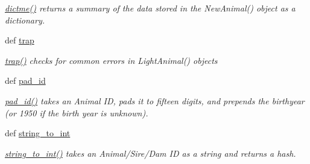 \begin{DoxyCompactItemize}
\begin{DoxyCompactList}\small\item\em \hyperlink{classPyPedal_1_1pyp__newclasses_1_1LightAnimal_a8016e0f0ce7359a441f944668ec312be}{dictme()} returns a summary of the data stored in the NewAnimal() object as a dictionary. \item\end{DoxyCompactList}\item 
def \hyperlink{classPyPedal_1_1pyp__newclasses_1_1LightAnimal_aaa37d1871c1611ed2eb0a20c89886339}{trap}
\begin{DoxyCompactList}\small\item\em \hyperlink{classPyPedal_1_1pyp__newclasses_1_1LightAnimal_aaa37d1871c1611ed2eb0a20c89886339}{trap()} checks for common errors in LightAnimal() objects \item\end{DoxyCompactList}\item 
def \hyperlink{classPyPedal_1_1pyp__newclasses_1_1LightAnimal_ae7811b64c92921123f64ae6cac0568da}{pad\_\-id}
\begin{DoxyCompactList}\small\item\em \hyperlink{classPyPedal_1_1pyp__newclasses_1_1LightAnimal_ae7811b64c92921123f64ae6cac0568da}{pad\_\-id()} takes an Animal ID, pads it to fifteen digits, and prepends the birthyear (or 1950 if the birth year is unknown). \item\end{DoxyCompactList}\item 
def \hyperlink{classPyPedal_1_1pyp__newclasses_1_1LightAnimal_aa45130d80a969ddccf4ce5ccc68a4932}{string\_\-to\_\-int}
\begin{DoxyCompactList}\small\item\em \hyperlink{classPyPedal_1_1pyp__newclasses_1_1LightAnimal_aa45130d80a969ddccf4ce5ccc68a4932}{string\_\-to\_\-int()} takes an Animal/Sire/Dam ID as a string and returns a hash. \item\end{DoxyCompactList}\end{DoxyCompactItemize}
